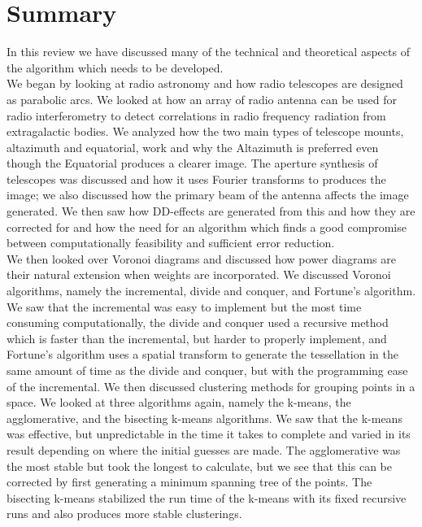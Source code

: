 \section{Summary}\label{sum}
In this review we have discussed many of the technical and theoretical aspects of the algorithm which needs to be developed.
\\
We began by looking at radio astronomy and how radio telescopes are designed as parabolic arcs. We looked at how an array of radio antenna can be used for radio interferometry to detect correlations in radio frequency radiation from extragalactic bodies. We analyzed how the two main types of telescope mounts, altazimuth and equatorial, work and why the Altazimuth is preferred even though the Equatorial produces a clearer image. The aperture synthesis of telescopes was discussed and how it uses Fourier transforms to produces the image; we also discussed how the primary beam of the antenna affects the image generated. We then saw how DD-effects are generated from this and how they are corrected for and how the need for an algorithm which finds a good compromise between computationally feasibility and sufficient error reduction.
\\
We then looked over Voronoi diagrams and discussed how power diagrams are their natural extension when weights are incorporated. We discussed Voronoi algorithms, namely the incremental, divide and conquer, and Fortune's algorithm. We saw that the incremental was easy to implement but the most time consuming computationally, the divide and conquer used a recursive method which is faster than the incremental, but harder to properly implement, and Fortune's algorithm uses a spatial transform to generate the tessellation in the same amount of time as the divide and conquer, but with the programming ease of the incremental. We then discussed clustering methods for grouping points in a space. We looked at three algorithms again, namely the k-means, the agglomerative, and the bisecting k-means algorithms. We saw that the k-means was effective, but unpredictable in the time it takes to complete and varied in its result depending on where the initial guesses are made. The agglomerative was the most stable but took the longest to calculate, but we see that this can be corrected by first generating a minimum spanning tree of the points. The bisecting k-means stabilized the run time of the k-means with its fixed recursive runs and also produces more stable clusterings.
\\
